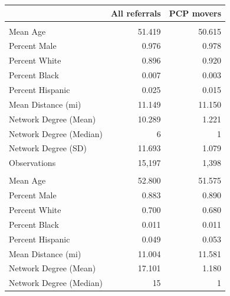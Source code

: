 \begin{tabular}{lrr}
\toprule
  & All referrals & PCP movers\\
\midrule
\addlinespace[0.3em]
\multicolumn{3}{l}{\textbf{Orthopedic Surgery}}\\
\hspace{1em}Mean Age & 51.419 & 50.615\\
\hspace{1em}Percent Male & 0.976 & 0.978\\
\hspace{1em}Percent White & 0.896 & 0.920\\
\hspace{1em}Percent Black & 0.007 & 0.003\\
\hspace{1em}Percent Hispanic & 0.025 & 0.015\\
\hspace{1em}Mean Distance (mi) & 11.149 & 11.150\\
\hspace{1em}Network Degree (Mean) & 10.289 & 1.221\\
\hspace{1em}Network Degree (Median) & 6 & 1\\
\hspace{1em}Network Degree (SD) & 11.693 & 1.079\\
\hspace{1em}Observations & 15,197 & 1,398\\
\addlinespace[0.3em]
\multicolumn{3}{l}{\textbf{Cardiology}}\\
\hspace{1em}Mean Age & 52.800 & 51.575\\
\hspace{1em}Percent Male & 0.883 & 0.890\\
\hspace{1em}Percent White & 0.700 & 0.680\\
\hspace{1em}Percent Black & 0.011 & 0.011\\
\hspace{1em}Percent Hispanic & 0.049 & 0.053\\
\hspace{1em}Mean Distance (mi) & 11.004 & 11.581\\
\hspace{1em}Network Degree (Mean) & 17.101 & 1.180\\
\hspace{1em}Network Degree (Median) & 15 & 1\\

\end{tabular}
